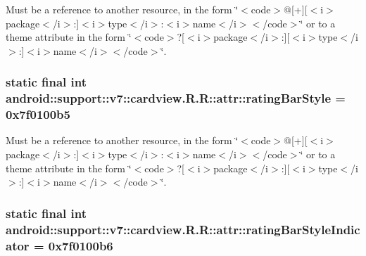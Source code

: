 Must be a reference to another resource, in the form \char`\"{}$<$code$>$@\mbox{[}+\mbox{]}\mbox{[}$<$i$>$package$<$/i$>$:\mbox{]}$<$i$>$type$<$/i$>$:$<$i$>$name$<$/i$>$$<$/code$>$\char`\"{} or to a theme attribute in the form \char`\"{}$<$code$>$?\mbox{[}$<$i$>$package$<$/i$>$:\mbox{]}\mbox{[}$<$i$>$type$<$/i$>$:\mbox{]}$<$i$>$name$<$/i$>$$<$/code$>$\char`\"{}. \hypertarget{classandroid_1_1support_1_1v7_1_1cardview_1_1_r_1_1attr_d0bd3f1d2cdb4eba5ec3a83d9814a30c}{
\subsubsection[{ratingBarStyle}]{\setlength{\rightskip}{0pt plus 5cm}static final int android::support::v7::cardview.R.R::attr::ratingBarStyle = 0x7f0100b5}}
\label{classandroid_1_1support_1_1v7_1_1cardview_1_1_r_1_1attr_d0bd3f1d2cdb4eba5ec3a83d9814a30c}


Must be a reference to another resource, in the form \char`\"{}$<$code$>$@\mbox{[}+\mbox{]}\mbox{[}$<$i$>$package$<$/i$>$:\mbox{]}$<$i$>$type$<$/i$>$:$<$i$>$name$<$/i$>$$<$/code$>$\char`\"{} or to a theme attribute in the form \char`\"{}$<$code$>$?\mbox{[}$<$i$>$package$<$/i$>$:\mbox{]}\mbox{[}$<$i$>$type$<$/i$>$:\mbox{]}$<$i$>$name$<$/i$>$$<$/code$>$\char`\"{}. \hypertarget{classandroid_1_1support_1_1v7_1_1cardview_1_1_r_1_1attr_2608d946c97132de347cc2e127a612c9}{
\subsubsection[{ratingBarStyleIndicator}]{\setlength{\rightskip}{0pt plus 5cm}static final int android::support::v7::cardview.R.R::attr::ratingBarStyleIndicator = 0x7f0100b6}}
\label{classandroid_1_1support_1_1v7_1_1cardview_1_1_r_1_1attr_2608d946c97132de347cc2e127a612c9}


